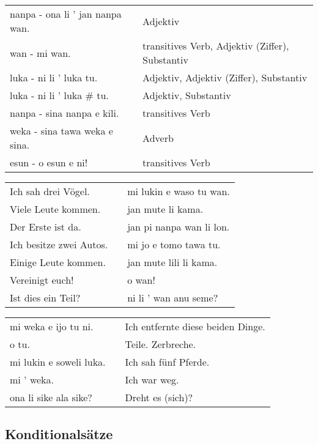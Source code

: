 \begin{supertabular}{p{5,5cm}|ll}
nanpa - ona li ' jan nanpa wan. && Adjektiv \\ %
wan - mi wan. && transitives Verb, Adjektiv (Ziffer), Substantiv \\ %
luka - ni li ' luka tu. && Adjektiv, Adjektiv (Ziffer), Substantiv \\ %
luka - ni li ' luka # tu. && Adjektiv, Substantiv \\ %
nanpa - sina nanpa e kili. && transitives Verb \\ %
weka - sina tawa weka e sina. && Adverb \\ %
esun - o esun e ni! && transitives Verb \\ %
\end{supertabular}

\begin{supertabular}{p{5,5cm}|ll}
Ich sah drei Vögel.  && mi lukin e waso tu wan. \\ %
Viele Leute kommen.  && jan mute li kama. \\ %
Der Erste ist da.   && jan pi nanpa wan li lon. \\ %
Ich besitze zwei Autos.  && mi jo e tomo tawa tu. \\ %
Einige Leute kommen.   && jan mute lili li kama. \\ %
Vereinigt euch!   && o wan! \\ %
Ist dies ein Teil? && ni li ' wan anu seme? \\ %
\end{supertabular}  

\begin{supertabular}{p{5,5cm}|ll}
mi weka e ijo tu ni.  && Ich entfernte diese beiden Dinge. \\
o tu.  && Teile. Zerbreche. \\
mi lukin e soweli luka.  && Ich sah fünf Pferde. \\
mi ' weka.  && Ich war weg. \\
ona li sike ala sike? && Dreht es (sich)? \\
\end{supertabular} 

\newpage
%
\subsection*{Konditionalsätze} 
\label{'la'}



